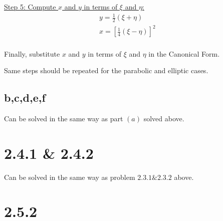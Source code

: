\documentclass{article}
\begin{document}
\quad \underline{Step 5: Compute $x$ and $y$ in terms of $\xi$ and $\eta$:}
\begin{align*}
  &y = \frac{1}{2} (\xi + \eta) &&\\
  &x = [\frac{1}{4} (\xi - \eta)]^2 &&\\
\end{align*}

Finally, substitute $x$ and $y$ in terms of $\xi$ and $\eta$ in the Canonical Form.
\newline

Same steps should be repeated for the parabolic and elliptic cases.

\newpage

\subsection*{b,c,d,e,f}
Can be solved in the same way as part $(a)$ solved above.

\newpage

\section*{2.4.1 \& 2.4.2}

Can be solved in the same way as problem $2.3.1 \& 2.3.2$ above.

\newpage

\section*{2.5.2}
\end{document}
